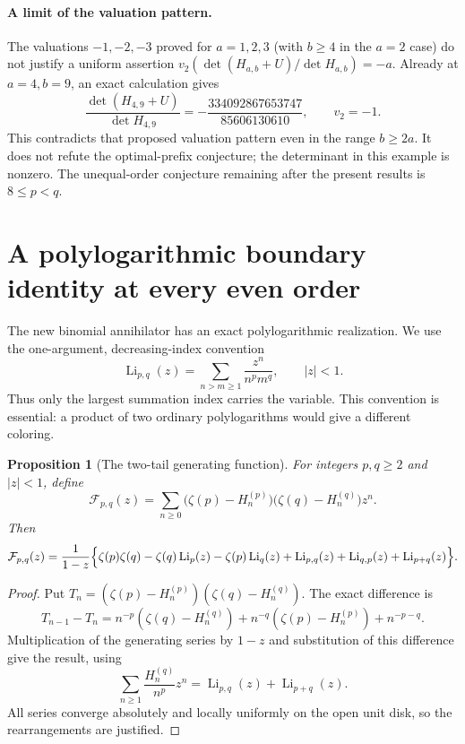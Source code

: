 \documentclass[11pt,a4paper]{article}
\numberwithin{equation}{section}
\theoremstyle{plain}
\newtheorem{proposition}[theorem]{Proposition}
\theoremstyle{definition}
\theoremstyle{remark}
\begin{document}
\paragraph{A limit of the valuation pattern.}
The valuations $-1,-2,-3$ proved for $a=1,2,3$ (with $b\ge4$
in the $a=2$ case) do not justify a
uniform assertion $v_2(\det(H_{a,b}+U)/\det H_{a,b})=-a$.
Already at $a=4,b=9$, an exact calculation gives
\[
 \frac{\det(H_{4,9}+U)}{\det H_{4,9}}
 =-\frac{334092867653747}{85606130610},
 \qquad v_2=-1.
\]
This contradicts that proposed valuation pattern even in the range
$b\ge2a$. It does not refute the optimal-prefix conjecture; the
determinant in this example is nonzero. The unequal-order conjecture
remaining after the present results is $8\le p<q$.



\section{A polylogarithmic boundary identity at every even order}
\label{sec:polylog-companion}

The new binomial annihilator has an exact polylogarithmic realization.
We use the one-argument, decreasing-index convention
\[
 \operatorname{Li}_{p,q}(z)=\sum_{n>m\ge1}\frac{z^n}{n^p m^q},
 \qquad |z|<1.
\]
Thus only the largest summation index carries the variable. This
convention is essential: a product of two ordinary polylogarithms
would give a different coloring.

\begin{proposition}[The two-tail generating function]
\label{prop:two-tail-polylog}
For integers $p,q\ge2$ and $|z|<1$, define
\[
 \mathcal F_{p,q}(z)=\sum_{n\ge0}
       \bigl(\zeta(p)-H_n^{(p)}\bigr)
       \bigl(\zeta(q)-H_n^{(q)}\bigr)z^n.
\]
Then
\begin{equation}\label{eq:two-tail-polylog}
 \mathcal F_{p,q}(z)=\frac{1}{1-z}\Bigl\{
 \zeta(p)\zeta(q)-\zeta(q)\operatorname{Li}_p(z)
 -\zeta(p)\operatorname{Li}_q(z)
 +\operatorname{Li}_{p,q}(z)+\operatorname{Li}_{q,p}(z)
 +\operatorname{Li}_{p+q}(z)\Bigr\}.
\end{equation}
\end{proposition}
\begin{proof}
Put $T_n=(\zeta(p)-H_n^{(p)})(\zeta(q)-H_n^{(q)})$.
The exact difference is
\[
 T_{n-1}-T_n=n^{-p}(\zeta(q)-H_n^{(q)})
            +n^{-q}(\zeta(p)-H_n^{(p)})+n^{-p-q}.
\]
Multiplication of the generating series by $1-z$ and substitution
of this difference give the result, using
\[
 \sum_{n\ge1}\frac{H_n^{(q)}}{n^p}z^n
   =\operatorname{Li}_{p,q}(z)+\operatorname{Li}_{p+q}(z).
\]
All series converge absolutely and locally uniformly on the open
unit disk, so the rearrangements are justified.
\end{proof}
\end{document}
